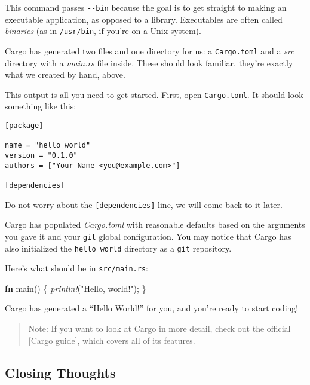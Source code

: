 \documentclass[a4paper,]{book}
\newenvironment{Shaded}{\begin{snugshade}}{\end{snugshade}}
\newcommand{\KeywordTok}[1]{\textcolor[rgb]{0.13,0.29,0.53}{\textbf{{#1}}}}
\newcommand{\StringTok}[1]{\textcolor[rgb]{0.31,0.60,0.02}{{#1}}}
\newcommand{\PreprocessorTok}[1]{\textcolor[rgb]{0.56,0.35,0.01}{\textit{{#1}}}}
\newcommand{\NormalTok}[1]{{#1}}
\begin{document}
This command passes \texttt{-\/-bin} because the goal is to get straight
to making an executable application, as opposed to a library.
Executables are often called \emph{binaries} (as in \texttt{/usr/bin},
if you're on a Unix system).

Cargo has generated two files and one directory for us: a
\texttt{Cargo.toml} and a \emph{src} directory with a \emph{main.rs}
file inside. These should look familiar, they're exactly what we created
by hand, above.

This output is all you need to get started. First, open
\texttt{Cargo.toml}. It should look something like this:

\begin{verbatim}
[package]

name = "hello_world"
version = "0.1.0"
authors = ["Your Name <you@example.com>"]

[dependencies]
\end{verbatim}

Do not worry about the \texttt{{[}dependencies{]}} line, we will come
back to it later.

Cargo has populated \emph{Cargo.toml} with reasonable defaults based on
the arguments you gave it and your \texttt{git} global configuration.
You may notice that Cargo has also initialized the \texttt{hello\_world}
directory as a \texttt{git} repository.

Here's what should be in \texttt{src/main.rs}:

\begin{Shaded}
\begin{Highlighting}[]
\KeywordTok{fn} \NormalTok{main() \{}
    \PreprocessorTok{println!}\NormalTok{(}\StringTok{"Hello, world!"}\NormalTok{);}
\NormalTok{\}}
\end{Highlighting}
\end{Shaded}

Cargo has generated a ``Hello World!'' for you, and you're ready to
start coding!

\begin{quote}
Note: If you want to look at Cargo in more detail, check out the
official {[}Cargo guide{]}, which covers all of its features.
\end{quote}

\subsection{Closing Thoughts}\label{closing-thoughts}
\end{document}
